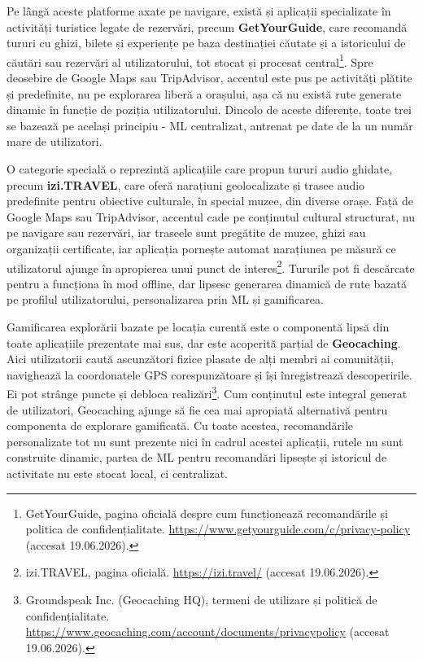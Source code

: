 \documentclass[12pt,a4paper]{report}
\begin{document}
Pe lângă aceste platforme axate pe navigare, există și aplicații specializate în activități turistice legate de rezervări, precum \textbf{GetYourGuide}, care recomandă tururi cu ghizi, bilete și experiențe pe baza destinației căutate și a istoricului de căutări sau rezervări al utilizatorului, tot stocat și procesat central\footnote{GetYourGuide, pagina oficială despre cum funcționează recomandările și politica de confidențialitate. \url{https://www.getyourguide.com/c/privacy-policy} (accesat 19.06.2026).}. Spre deosebire de Google Maps sau TripAdvisor, accentul este pus pe activități plătite și predefinite, nu pe explorarea liberă a orașului, așa că nu există rute generate dinamic în funcție de poziția utilizatorului. Dincolo de aceste diferențe, toate trei se bazează pe același principiu - ML centralizat, antrenat pe date de la un număr mare de utilizatori.

O categorie specială o reprezintă aplicațiile care propun tururi audio ghidate, precum \textbf{izi.TRAVEL}, care oferă narațiuni geolocalizate și trasee audio predefinite pentru obiective culturale, în special muzee, din diverse orașe. Față de Google Maps sau TripAdvisor, accentul cade pe conținutul cultural structurat, nu pe navigare sau rezervări, iar traseele sunt pregătite de muzee, ghizi sau organizații certificate, iar aplicația pornește automat narațiunea pe măsură ce utilizatorul ajunge în apropierea unui punct de interes\footnote{izi.TRAVEL, pagina oficială. \url{https://izi.travel/} (accesat 19.06.2026).}. Tururile pot fi descărcate pentru a funcționa în mod offline, dar lipsesc generarea dinamică de rute bazată pe profilul utilizatorului, personalizarea prin ML și gamificarea.

Gamificarea explorării bazate pe locația curentă este o componentă lipsă din toate aplicațiile prezentate mai sus, dar este acoperită parțial de \textbf{Geocaching}. Aici utilizatorii caută ascunzători fizice plasate de alți membri ai comunității, navighează la coordonatele GPS corespunzătoare și își înregistrează descoperirile. Ei pot strânge puncte și debloca realizări\footnote{Groundspeak Inc. (Geocaching HQ), termeni de utilizare și politică de confidențialitate. \url{https://www.geocaching.com/account/documents/privacypolicy} (accesat 19.06.2026).}. Cum conținutul este integral generat de utilizatori, Geocaching ajunge să fie cea mai apropiată alternativă pentru componenta de explorare gamificată. Cu toate acestea, recomandările personalizate tot nu sunt prezente nici în cadrul acestei aplicații, rutele nu sunt construite dinamic, partea de ML pentru recomandări lipsește și istoricul de activitate nu este stocat local, ci centralizat.
\end{document}
